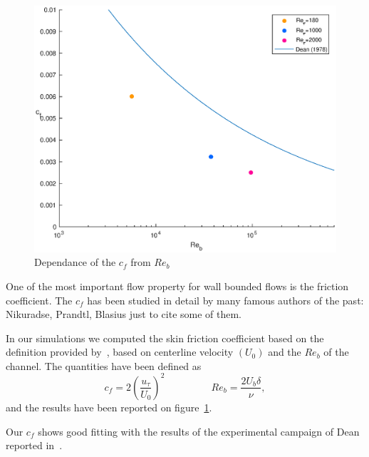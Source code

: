 \begin{figure}
\begin{center}
\includegraphics[scale=0.55]{grafici/cf.eps}
\caption{Dependance of the $c_{f}$ from $Re_{b}$}
\label{cf}
\end{center}
\end{figure}


One of the most important flow property for wall bounded flows is the friction coefficient.
The $c_{f}$ has been studied in detail by many famous authors of the past: Nikuradse, Prandtl, Blasius just to cite some of them. \par
In our simulations we computed the skin friction coefficient based on the definition provided by~\cite[279]{pope}, based on centerline velocity $(U_{0})$ and the $Re_{b}$ of the channel.
The quantities have been defined as
\begin{equation*}
c_{f}= 2(\frac{u_{\tau}}{U_{0}})^{2}	\quad~\quad~\quad~\quad	Re_{b}= \frac{2 U_{b} \delta}{\nu},
\end{equation*}
and the results have been reported on figure~\ref{cf}. \par
Our $c_{f}$ shows good fitting with the results of the experimental campaign of Dean reported in~\cite{Dean}.


